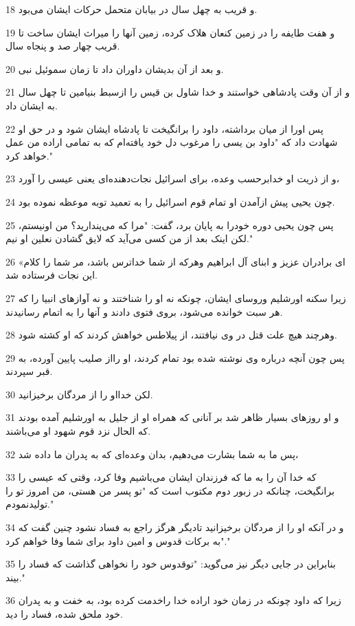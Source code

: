 \par 18 و قریب به چهل سال در بیابان متحمل حرکات ایشان می‌بود.
\par 19 و هفت طایفه را در زمین کنعان هلاک کرده، زمین آنها را میراث ایشان ساخت تا قریب چهار صد و پنجاه سال.
\par 20 و بعد از آن بدیشان داوران داد تا زمان سموئیل نبی.
\par 21 و از آن وقت پادشاهی خواستند و خدا شاول بن قیس را ازسبط بنیامین تا چهل سال به ایشان داد.
\par 22 پس اورا از میان برداشته، داود را برانگیخت تا پادشاه ایشان شود و در حق او شهادت داد که "داود بن یسی را مرغوب دل خود یافته‌ام که به تمامی اراده من عمل خواهد کرد."
\par 23 و از ذریت او خدابرحسب وعده، برای اسرائیل نجات‌دهنده‌ای یعنی عیسی را آورد،
\par 24 چون یحیی پیش ازآمدن او تمام قوم اسرائیل را به تعمید توبه موعظه نموده بود.
\par 25 پس چون یحیی دوره خودرا به پایان برد، گفت: "مرا که می‌پندارید؟ من اونیستم، لکن اینک بعد از من کسی می‌آید که لایق گشادن نعلین او نیم."
\par 26 «ای برادران عزیز و ابنای آل ابراهیم وهرکه از شما خداترس باشد، مر شما را کلام این نجات فرستاده شد.
\par 27 زیرا سکنه اورشلیم وروسای ایشان، چونکه نه او را شناختند و نه آوازهای انبیا را که هر سبت خوانده می‌شود، بروی فتوی دادند و آنها را به اتمام رسانیدند.
\par 28 وهر‌چند هیچ علت قتل در وی نیافتند، از پیلاطس خواهش کردند که او کشته شود.
\par 29 پس چون آنچه درباره وی نوشته شده بود تمام کردند، او رااز صلیب پایین آورده، به قبر سپردند.
\par 30 لکن خدااو را از مردگان برخیزانید.
\par 31 و او روزهای بسیار ظاهر شد بر آنانی که همراه او از جلیل به اورشلیم آمده بودند که الحال نزد قوم شهود او می‌باشند.
\par 32 پس ما به شما بشارت می‌دهیم، بدان وعده‌ای که به پدران ما داده شد،
\par 33 که خدا آن را به ما که فرزندان ایشان می‌باشیم وفا کرد، وقتی که عیسی را برانگیخت، چنانکه در زبور دوم مکتوب است که "تو پسر من هستی، من امروز تو را تولیدنمودم."
\par 34 و در آنکه او را از مردگان برخیزانید تادیگر هرگز راجع به فساد نشود چنین گفت که "به برکات قدوس و امین داود برای شما وفا خواهم کرد."
\par 35 بنابراین در جایی دیگر نیز می‌گوید: "توقدوس خود را نخواهی گذاشت که فساد را بیند."
\par 36 زیرا که داود چونکه در زمان خود اراده خدا راخدمت کرده بود، به خفت و به پدران خود ملحق شده، فساد را دید.
